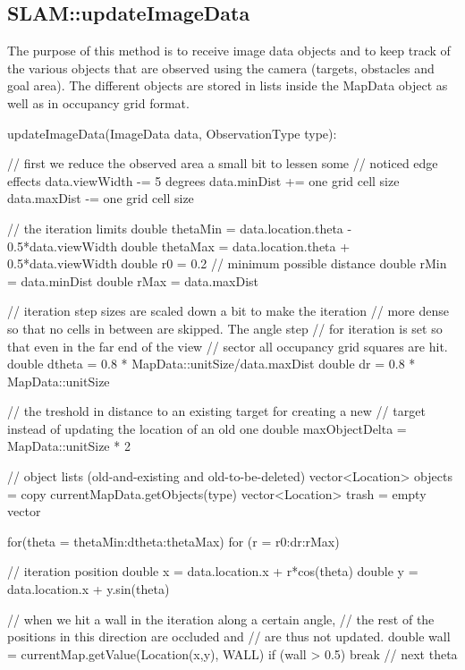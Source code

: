 \documentclass[a4paper,10pt]{article}
\begin{document}
\begin{appendices}
\begin{verbatim}
\end{verbatim}

\subsection{SLAM::updateImageData}

The purpose of this method is to receive image data objects and to keep track of the various objects that are observed using the camera (targets, obstacles and goal area). The different objects are stored in lists inside the MapData object as well as in occupancy grid format.

\begin{verbatimtab}
updateImageData(ImageData data, ObservationType type):

// first we reduce the observed area a small bit to lessen some 
// noticed edge effects
data.viewWidth -= 5 degrees
data.minDist += one grid cell size
data.maxDist -= one grid cell size

// the iteration limits
double thetaMin = data.location.theta - 0.5*data.viewWidth
double thetaMax = data.location.theta + 0.5*data.viewWidth
double r0 = 0.2 // minimum possible distance
double rMin = data.minDist
double rMax = data.maxDist

// iteration step sizes are scaled down a bit to make the iteration 
// more dense so that no cells in between are skipped. The angle step 
// for iteration is set so that even in the far end of the view 
// sector all occupancy grid squares are hit.
double dtheta = 0.8 * MapData::unitSize/data.maxDist
double dr = 0.8 * MapData::unitSize

// the treshold in distance to an existing target for creating a new 
// target instead of updating the location of an old one
double maxObjectDelta = MapData::unitSize * 2

// object lists (old-and-existing and old-to-be-deleted)
vector<Location> objects = copy currentMapData.getObjects(type)
vector<Location> trash = empty vector

for(theta = thetaMin:dtheta:thetaMax) for (r = r0:dr:rMax) {
	// iteration position
	double x = data.location.x + r*cos(theta)
	double y = data.location.x + y.sin(theta)
	
	// when we hit a wall in the iteration along a certain angle, 
	// the rest of the positions in this direction are occluded and
	// are thus not updated.
	double wall = currentMap.getValue(Location(x,y), WALL)
	if (wall > 0.5) {
		break // next theta
	}
	
}
\end{verbatimtab}
\end{appendices}
\end{document}

